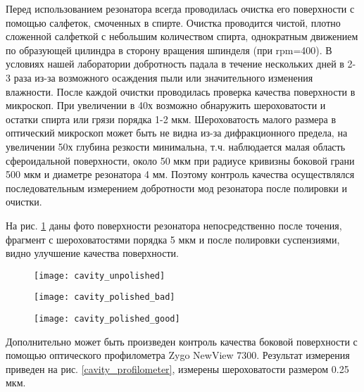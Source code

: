 Перед использованием резонатора всегда проводилась очистка его поверхности с помощью салфеток, смоченных в спирте. Очистка проводится чистой, плотно сложенной салфеткой с небольшим количеством спирта, однократным движением по образующей цилиндра в сторону вращения шпинделя (при rpm=400). В условиях нашей лаборатории добротность падала в течение нескольких дней в 2-3 раза из-за возможного осаждения пыли или значительного изменения влажности. После каждой очистки проводилась проверка качества поверхности в микроскоп. При увеличении в 40х возможно обнаружить шероховатости и остатки спирта или грязи порядка 1-2 мкм. Шероховатость малого размера в оптический микроскоп может быть не видна из-за дифракционного предела, на увеличении 50х глубина резкости минимальна, т.ч. наблюдается малая область сфероидальной поверхности, около 50 мкм при радиусе кривизны боковой грани 500 мкм и диаметре резонатора 4 мм. Поэтому контроль качества осуществлялся последовательным измерением добротности мод резонатора после полировки и очистки.

На рис. \ref{cavity_polished} даны фото поверхности резонатора непосредственно после точения, фрагмент с шероховатостями порядка 5 мкм и после полировки суспензиями, видно улучшение качества поверхности.

\begin{figure}[ht]
  \begin{minipage}[ht]{0.32\linewidth}\centering
    \texttt{[image: cavity\_unpolished]}
  \end{minipage}
  \hfill
  \begin{minipage}[ht]{0.32\linewidth}\centering
    \texttt{[image: cavity\_polished\_bad]}
  \end{minipage}
  \hfill
  \begin{minipage}[ht]{0.32\linewidth}\centering
    \texttt{[image: cavity\_polished\_good]}
  \end{minipage}
  \label{cavity_polished}
\end{figure}

Дополнительно может быть произведен контроль качества боковой поверхности с помощью оптического профилометра Zygo NewView 7300. Результат измерения приведен на рис. \ref{cavity_profilometer}, измерены шероховатости размером 0.25 мкм.

